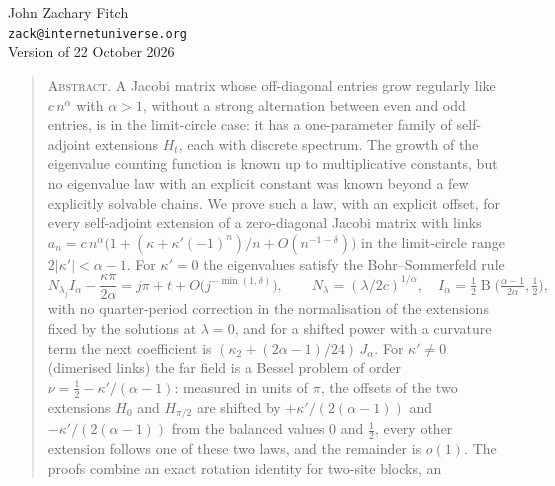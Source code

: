 \documentclass[12pt,letterpaper]{article}
\theoremstyle{esmath-tier3}
\newcommand{\B}{\operatorname{B}}
\begin{document}
\begin{center}
\\[4pt]
\\[10pt]
{\normalsize John Zachary Fitch}\\[1pt]
{\small\texttt{zack@internetuniverse.org}}\\[1pt]
{\small Version of 22 October 2026}
\end{center}

\esrule

\begin{quote}\small
\textsc{Abstract.} A Jacobi matrix whose off-diagonal entries grow regularly like $c\,n^\alpha$
with $\alpha>1$, without a strong alternation between even and odd entries, is in the limit-circle
case: it has a one-parameter family of self-adjoint extensions $H_t$, each with discrete spectrum.
The growth of the eigenvalue counting function is known up to multiplicative constants, but no
eigenvalue law with an explicit constant was known beyond a few explicitly solvable chains. We
prove such a law, with an explicit offset, for every self-adjoint extension of a zero-diagonal
Jacobi matrix with links $a_n=c\,n^\alpha\bigl(1+(\kappa+\kappa'(-1)^n)/n+O(n^{-1-\delta})\bigr)$ in
the limit-circle range $2|\kappa'|<\alpha-1$. For $\kappa'=0$ the eigenvalues satisfy the
Bohr--Sommerfeld rule
\[
  N_{\lambda_j} I_\alpha-\frac{\kappa\pi}{2\alpha}=j\pi+t+O\bigl(j^{-\min(1,\delta)}\bigr),
  \qquad N_\lambda=(\lambda/2c)^{1/\alpha},\quad
  I_\alpha=\tfrac12\B\bigl(\tfrac{\alpha-1}{2\alpha},\tfrac12\bigr),
\]
with no quarter-period correction in the normalisation of the extensions fixed by the solutions at
$\lambda=0$, and for a shifted power with a curvature term the next coefficient is
$(\kappa_2+(2\alpha-1)/24)\,J_\alpha$. For $\kappa'\neq0$ (dimerised links) the far field is a Bessel
problem of order $\nu=\tfrac12-\kappa'/(\alpha-1)$: measured in units of $\pi$, the offsets of the two
extensions $H_0$ and $H_{\pi/2}$ are shifted by $+\kappa'/(2(\alpha-1))$ and $-\kappa'/(2(\alpha-1))$
from the balanced values $0$ and $\tfrac12$, every other extension follows one of these two laws, and
the remainder is $o(1)$. The proofs combine an exact rotation identity for two-site blocks, an

\end{quote}
\end{document}
